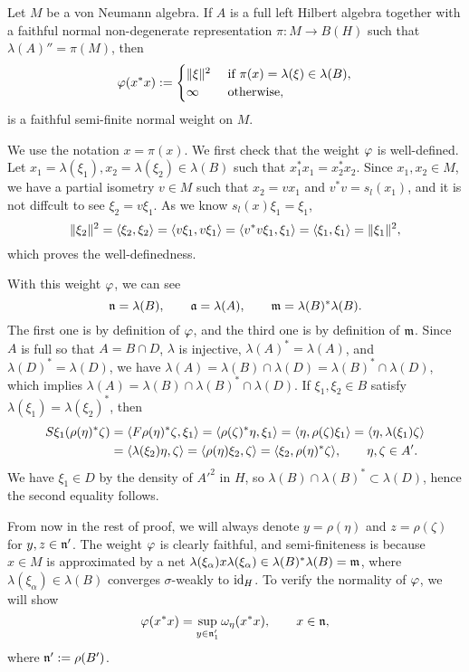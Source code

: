 \documentclass{../../small}
\begin{document}
\begin{thm}
Let $M$ be a von Neumann algebra.
If $A$ is a full left Hilbert algebra together with a faithful normal non-degenerate representation $\pi:M\to B(H)$ such that $\lambda(A)''=\pi(M)$, then
\[\varphi(x^*x):=\begin{cases}\|\xi\|^2&\text{ if }\pi(x)=\lambda(\xi)\in\lambda(B),\\\infty&\text{ otherwise},\end{cases}\]
is a faithful semi-finite normal weight on $M$.
\end{thm}
\begin{pf}
We use the notation $x=\pi(x)$.
We first check that the weight $\varphi$ is well-defined.
Let $x_1=\lambda(\xi_1),x_2=\lambda(\xi_2)\in\lambda(B)$ such that $x_1^*x_1=x_2^*x_2$.
Since $x_1,x_2\in M$, we have a partial isometry $v\in M$ such that $x_2=vx_1$ and $v^*v=s_l(x_1)$, and it is not diffcult to see $\xi_2=v\xi_1$.
As we know $s_l(x)\xi_1=\xi_1$,
\[\|\xi_2\|^2=\langle\xi_2,\xi_2\rangle=\langle v\xi_1,v\xi_1\rangle=\langle v^*v\xi_1,\xi_1\rangle=\langle\xi_1,\xi_1\rangle=\|\xi_1\|^2,\]
which proves the well-definedness.

With this weight $\varphi$, we can see
\[\mathfrak{n}=\lambda(B),\qquad\mathfrak{a}=\lambda(A),\qquad\mathfrak{m}=\lambda(B)^*\lambda(B).\]
The first one is by definition of $\varphi$, and the third one is by definition of $\mathfrak{m}$.
Since $A$ is full so that $A=B\cap D$, $\lambda$ is injective, $\lambda(A)^*=\lambda(A)$, and $\lambda(D)^*=\lambda(D)$, we have $\lambda(A)=\lambda(B)\cap\lambda(D)=\lambda(B)^*\cap\lambda(D)$, which implies $\lambda(A)=\lambda(B)\cap\lambda(B)^*\cap\lambda(D)$.
If $\xi_1,\xi_2\in B$ satisfy $\lambda(\xi_1)=\lambda(\xi_2)^*$, then
\begin{align*}
S\xi_1(\rho(\eta)^*\zeta)
&=\langle F\rho(\eta)^*\zeta,\xi_1\rangle
=\langle\rho(\zeta)^*\eta,\xi_1\rangle
=\langle\eta,\rho(\zeta)\xi_1\rangle
=\langle\eta,\lambda(\xi_1)\zeta\rangle\\
&=\langle\lambda(\xi_2)\eta,\zeta\rangle
=\langle\rho(\eta)\xi_2,\zeta\rangle
=\langle\xi_2,\rho(\eta)^*\zeta\rangle,
\qquad\eta,\zeta\in A'.
\end{align*}
We have $\xi_1\in D$ by the density of $A'^2$ in $H$, so $\lambda(B)\cap\lambda(B)^*\subset\lambda(D)$, hence the second equality follows.

From now in the rest of proof, we will always denote $y=\rho(\eta)$ and $z=\rho(\zeta)$ for $y,z\in\mathfrak{n}'$.
The weight $\varphi$ is clearly faithful, and semi-finiteness is because $x\in M$ is approximated by a net $\lambda(\xi_\alpha)x\lambda(\xi_\alpha)\in\lambda(B)^*\lambda(B)=\mathfrak{m}$, where $\lambda(\xi_\alpha)\in\lambda(B)$ converges $\sigma$-weakly to $\operatorname{id}_H$.
To verify the normality of $\varphi$, we will show
\[\varphi(x^*x)=\sup_{y\in\mathfrak{n}'_1}\omega_{\eta}(x^*x),\qquad x\in\mathfrak{n},\]
where $\mathfrak{n}':=\rho(B')$.


\end{pf}
\end{document}

